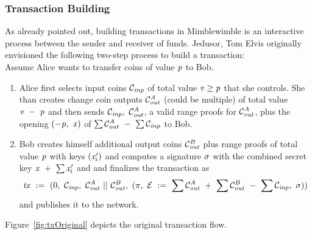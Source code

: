 \subsubsection{Transaction Building}
As already pointed out, building transactions in Mimblewimble is an interactive process between the sender and receiver of funds. Jedusor, Tom Elvis originally envisioned the following two-step process
to build a transaction:~\cite{jedusor2016mimblewimble}\\
Assume Alice wants to transfer coins of value $\mathit{p}$ to Bob.
\begin{enumerate}
    \item Alice first selects input coins $\mathcal{C}_{\mathit{inp}}$ of total value $\mathit{v} \geq \mathit{p}$ that she controls. She than creates change coin outputs $\mathcal{C}_{\mathit{out}}^{\mathit{A}}$ (could be multiple) of total value $\mathit{v} ~-~ \mathit{p}$ and then
    sends $\mathcal{C}_{\mathit{inp}} ,~ \mathcal{C}_{\mathit{out}}^{\mathit{A}}$, a valid range proofs for $\mathcal{C}_{\mathit{out}}^{\mathit{A}}$, plus the opening $(-\mathit{p} ,~ \mathit{x})$ of $\sum{\mathcal{C}_{\mathit{out}}^{\mathit{A}}} ~-~ \sum{\mathcal{C}_{\mathit{inp}}}$ to Bob.
    \item Bob creates himself additional output coins $\mathcal{C}_{\mathit{out}}^B$ plus range proofs of total value $\mathit{p}$ with keys $(\mathit{x}'_i)$ and computes a signature $\sigma$ with the combined secret key $\mathit{x} ~+~ \sum{\mathit{x}'_i}$ and
    and finalizes the transaction as
    \[ \mathit{tx} ~:=~ (0 ,~ \mathcal{C}_{\mathit{inp}} ,~ \mathcal{C}_{\mathit{out}}^A ~||~ \mathcal{C}_{\mathit{out}}^B ,~ (\pi ,~ \mathcal{E} ~:=~ \sum{\mathcal{C}_{\mathit{out}}^A} ~+~ \sum{\mathcal{C}_{\mathit{out}}^B} ~-~ \sum{\mathcal{C}_{\mathit{inp}}} ,~ \sigma)) \]
    and publishes it to the network.
\end{enumerate}
Figure~\ref{fig:txOriginal} depicts the original transaction flow.\\
